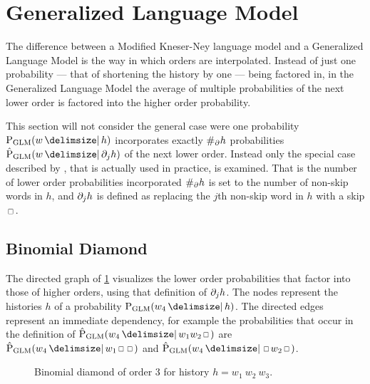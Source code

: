 \section{Generalized Language Model}
\label{sec:weightedsum-glm}

The difference between a Modified Kneser-Ney language model and a
Generalized Language Model is the way in which orders are interpolated.
Instead of just one probability --- that of shortening the history by one ---
being factored in, in the Generalized Language Model the average of multiple
probabilities of the next lower order is factored into the higher order
probability.

This section will not consider the general case were one probability
$\ProbGLM{w}{h}$ incorporates exactly $\NumSkpOp{h}$ probabilities
$\ProbGLM*{w}{\SkpOp[j]{h}}$ of the next lower order.
Instead only the special case described by \textcite{Pickhardt2014}, that is
actually used in practice, is examined.
That is the number of lower order probabilities incorporated $\NumSkpOp{h}$
is set to the number of non-skip words in $h$, and $\SkpOp[j]{h}$ is defined as
replacing the $j$th non-skip word in $h$ with a skip $\Skp$.

\subsection{Binomial Diamond}


The directed graph of \cref{fig:history-glm} visualizes the lower order
probabilities that factor into those of higher orders, using that definition of
$\SkpOp[j]{h}$.
The nodes represent the histories $h$ of a probability $\ProbGLM{w_4}{h}$.
The directed edges represent an immediate dependency, for example the
probabilities that occur in the definition of
$\ProbGLM*{w_4}{w_1 w_2 \Skp}$ are $\ProbGLM*{w_4}{w_1 \Skp \Skp}$ and
$\ProbGLM*{w_4}{\Skp w_2 \Skp}$.

\begin{figure}
  \centering
  
  \caption{
    Binomial diamond of order 3 for history $h = w_1 \: w_2 \: w_3$.
  }
  \label{fig:history-glm}
\end{figure}

